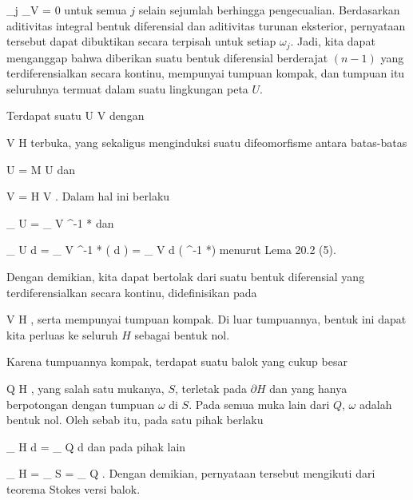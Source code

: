 {{\mavergleichskettedisp
{\vergleichskette
{ \omega_j \vert_V
}
{ =} { 0
}
{ } {
}
{ } {
}
{ } {
}
}
{}{}{}
untuk semua $j$ selain sejumlah berhingga pengecualian. Berdasarkan
aditivitas integral bentuk diferensial
dan
aditivitas turunan eksterior,
pernyataan tersebut dapat dibuktikan secara terpisah untuk setiap $\omega_j$. Jadi, kita dapat menganggap bahwa diberikan suatu bentuk diferensial berderajat $(n-1)$ yang terdiferensialkan secara kontinu, mempunyai tumpuan kompak, dan tumpuan itu seluruhnya termuat dalam suatu lingkungan peta $U$.}
{}
\teilbeweis {}{}{}
{Terdapat suatu
\maabb {\alpha} { U } { V
} {}
dengan

\mavergleichskette
{\vergleichskette
{ V
}
{ \subseteq }{ H
}
{  }{
}
{    }{
}
{   }{
}
}
{}{}{}
terbuka, yang sekaligus menginduksi suatu difeomorfisme antara batas-batas

\mavergleichskette
{\vergleichskette
{ \partial U
}
{ = }{ \partial M \cap U
}
{  }{
}
{    }{
}
{   }{
}
}
{}{}{}
dan

\mavergleichskette
{\vergleichskette
{ \partial V
}
{ = }{ \partial H \cap V
}
{  }{
}
{    }{
}
{   }{
}
}
{}{}{.}
Dalam hal ini berlaku

\mavergleichskettedisp
{\vergleichskette
{
\int_{  \partial U  }   \omega
}
{ =} {
\int_{  \partial V  }  \alpha^{-1 *}\omega
}
{ } {
}
{ } {
}
{ } {
}
}
{}{}{}
dan

\mavergleichskettedisp
{\vergleichskette
{
\int_{ U  }  d \omega
}
{ =} {
\int_{ V  }  \alpha^{-1 *} (  d \omega)
}
{ =} {
\int_{  V  }  d \left(  \alpha^{-1 *}\omega  \right)
}
{ } {
}
{ } {
}
}
{}{}{}
menurut
Lema 20.2 (5).}
{\leerzeichen{}Dengan demikian, kita dapat bertolak dari suatu bentuk diferensial yang terdiferensialkan secara kontinu, didefinisikan pada

\mavergleichskette
{\vergleichskette
{ V
}
{ \subseteq }{ H
}
{  }{
}
{    }{
}
{   }{
}
}
{}{}{,}
serta mempunyai tumpuan kompak. Di luar tumpuannya, bentuk ini dapat kita perluas ke seluruh $H$ sebagai bentuk nol.}
\teilbeweis {}{}{}
{Karena tumpuannya kompak, terdapat suatu balok yang cukup besar

\mavergleichskette
{\vergleichskette
{ Q
}
{ \subseteq }{ H
}
{  }{
}
{    }{
}
{   }{
}
}
{}{}{,}
yang salah satu mukanya, $S$, terletak pada $\partial H$ dan yang hanya berpotongan dengan tumpuan $\omega$ di $S$. Pada semua muka lain dari $Q$, $\omega$
 {} {}
adalah bentuk nol. Oleh sebab itu, pada satu pihak berlaku

\mavergleichskettedisp
{\vergleichskette
{
\int_{ H  }  d\omega
}
{ =} {
\int_{ Q  }  d\omega
}
{ } {
}
{ } {
}
{ } {
}
}
{}{}{}
dan pada pihak lain

\mavergleichskettedisp
{\vergleichskette
{
\int_{  \partial H  }   \omega
}
{ =} {
\int_{  S  }   \omega
}
{ =} {
\int_{  \partial Q  }   \omega
}
{ } {
}
{ } {
}
}
{}{}{.}
Dengan demikian, pernyataan tersebut mengikuti dari
teorema Stokes versi balok.}
{}

}



